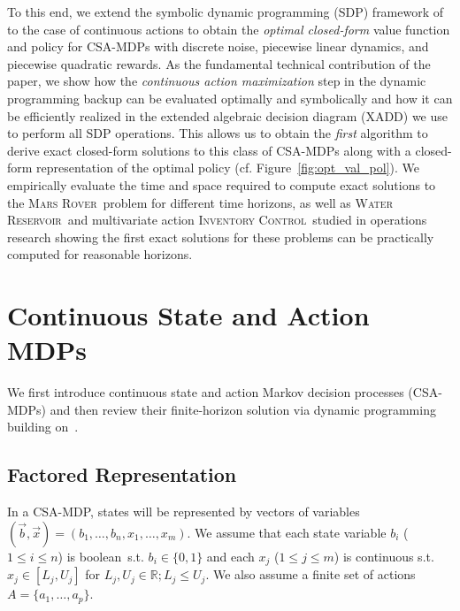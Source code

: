 \documentclass[letterpaper]{article}
\newcommand{\MarsRover}{\textsc{Mars Rover}}
\newcommand{\InventoryControl}{\textsc{Inventory Control}}
\newcommand{\WaterReservoir}{\textsc{Water Reservoir}}
\begin{document}
To this end, we extend the symbolic dynamic programming (SDP) framework
of~\cite{sanner_uai11} to the case of continuous actions to obtain the
\emph{optimal closed-form} value function and policy for CSA-MDPs with
discrete noise, piecewise linear dynamics, and piecewise quadratic
rewards.  As the fundamental technical contribution of the paper, we
show how the \emph{continuous action maximization} step in the dynamic
programming backup can be evaluated optimally and symbolically and how
it can be efficiently realized in the extended algebraic decision diagram (XADD)
we use to perform all SDP operations.  This
allows us to obtain the \emph{first} algorithm to derive exact closed-form
solutions to this class of CSA-MDPs along with a closed-form
representation of the optimal policy
(cf. Figure~\ref{fig:opt_val_pol}).  
We empirically evaluate the time and space required to compute exact
solutions to the \MarsRover\ problem for different time horizons, as
well as \WaterReservoir\ and multivariate action \InventoryControl\
studied in operations research showing the first exact solutions for
these problems can be practically computed for reasonable horizons.

\section{Continuous State and Action MDPs}

\label{sec:dcmdps}

We first introduce continuous state and action Markov decision
processes (CSA-MDPs) and then review their finite-horizon solution via
dynamic programming building on~\cite{sanner_uai11}.  

\subsection{Factored Representation}

In a CSA-MDP, states will be represented by vectors of variables
$(\vec{b},\vec{x}) = ( b_1,\ldots,b_n,x_{1},\ldots,x_m )$.  We assume
that each state variable $b_i$ ($1 \leq i \leq n$) is
boolean$\,$ s.t. $b_i \in \{ 0,1 \}$ and each $x_j$ ($1 \leq j \leq m$) is 
continuous s.t. $x_j \in [L_j,U_j]$ for $L_j,U_j \in
\mathbb{R}; L_j \leq U_j$.  We also assume a finite set of actions $A
= \{ a_1, \ldots, a_p \}$.
\end{document}
